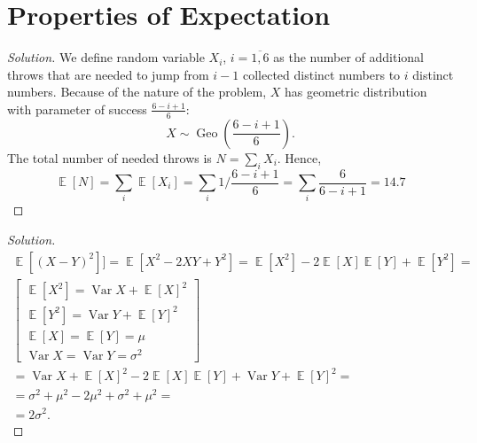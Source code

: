 \documentclass{article}[12pt]
\newenvironment{solution}
  {\renewcommand\qedsymbol{$\blacksquare$}\begin{proof}[Solution]}
  {\end{proof}}
\newenvironment{problem}[1]
  {\renewcommand\theinnercustomprblm{#1}\innercustomprblm}
  {\endinnercustomprblm}
\DeclareMathOperator{\Var}{Var}
\DeclareMathOperator{\Geo}{Geo}
\DeclareMathOperator{\E}{\mathbb{E}}
\begin{document}
\newpage

\section{Properties of Expectation}

\begin{problem}{7.22}
\end{problem}
\begin{solution}
We define random variable $X_i$, $i=\overline{1,6}$ as the number of additional throws that are needed to jump from $i-1$ collected distinct numbers to $i$ distinct numbers.
Because of the nature of the problem, $X$ has geometric distribution with parameter of success $\frac{6 - i + 1}{6}$:
\begin{equation*}
    X\sim\Geo\left(\frac{6 - i + 1}{6}\right).
\end{equation*}
The total number of needed throws is $N = \sum_{i}X_{i}$.
Hence,
\begin{equation*}
    \E[N] = \sum_{i}\E[X_{i}] = \sum_{i}1\Big/\frac{6 - i + 1}{6} = \sum_{i}\frac{6}{6 - i + 1} = 14.7
\end{equation*}
\end{solution}

\begin{problem}{7.30}
\end{problem}
\begin{solution}
\begin{gather*}
    \E\left[(X - Y)^{2}\right]] = \E[X^{2} - 2XY + Y^{2}] = \E[X^{2}] - 2\E[X]\E[Y] + \E[Y^{2}] =
    \\
    \begin{bmatrix}
        \E[X^{2}] = \Var X + \E[X]^{2} 
        \\
        \E[Y^{2}] = \Var Y + \E[Y]^{2}
        \\
        \E[X] = \E[Y] = \mu
        \\
        \Var X = \Var Y = \sigma^{2}
    \end{bmatrix}
    \\
    = \Var X + \E[X]^{2} - 2\E[X]\E[Y] + \Var Y + \E[Y]^{2} =
    \\
    = \sigma^{2} + \mu^{2} - 2\mu^{2} + \sigma^{2} + \mu^{2} =
    \\
    = 2\sigma^{2}.
\end{gather*}
\end{solution}
\end{document}
